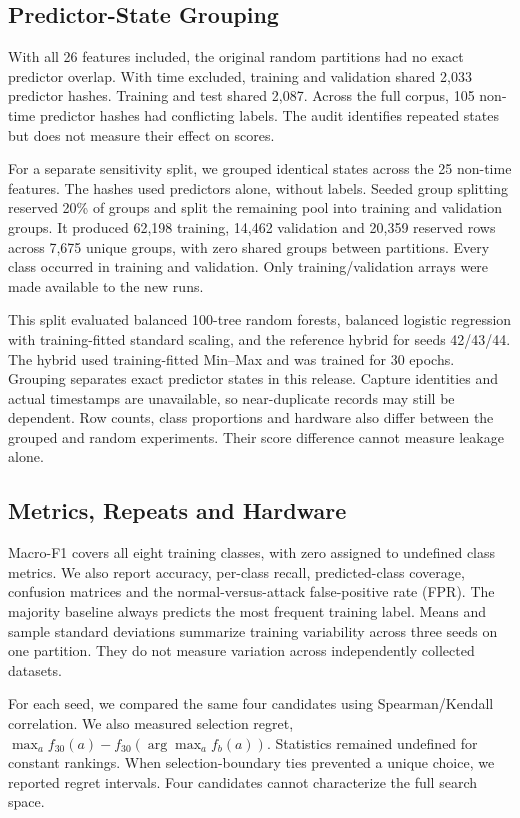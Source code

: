 \subsection{Predictor-State Grouping}
With all 26 features included, the original random partitions had no exact predictor overlap. With time excluded, training and validation shared 2,033 predictor hashes. Training and test shared 2,087. Across the full corpus, 105 non-time predictor hashes had conflicting labels. The audit identifies repeated states but does not measure their effect on scores.

For a separate sensitivity split, we grouped identical states across the 25 non-time features. The hashes used predictors alone, without labels. Seeded group splitting reserved 20\% of groups and split the remaining pool into training and validation groups. It produced 62,198 training, 14,462 validation and 20,359 reserved rows across 7,675 unique groups, with zero shared groups between partitions. Every class occurred in training and validation. Only training/validation arrays were made available to the new runs.

This split evaluated balanced 100-tree random forests, balanced logistic regression with training-fitted standard scaling, and the reference hybrid for seeds 42/43/44. The hybrid used training-fitted Min--Max and was trained for 30 epochs. Grouping separates exact predictor states in this release. Capture identities and actual timestamps are unavailable, so near-duplicate records may still be dependent. Row counts, class proportions and hardware also differ between the grouped and random experiments. Their score difference cannot measure leakage alone.

\subsection{Metrics, Repeats and Hardware}
Macro-F1 covers all eight training classes, with zero assigned to undefined class metrics. We also report accuracy, per-class recall, predicted-class coverage, confusion matrices and the normal-versus-attack false-positive rate (FPR). The majority baseline always predicts the most frequent training label. Means and sample standard deviations summarize training variability across three seeds on one partition. They do not measure variation across independently collected datasets.

For each seed, we compared the same four candidates using Spearman/Kendall correlation. We also measured selection regret, $\max_a f_{30}(a)-f_{30}(\arg\max_a f_b(a))$. Statistics remained undefined for constant rankings. When selection-boundary ties prevented a unique choice, we reported regret intervals. Four candidates cannot characterize the full search space.

